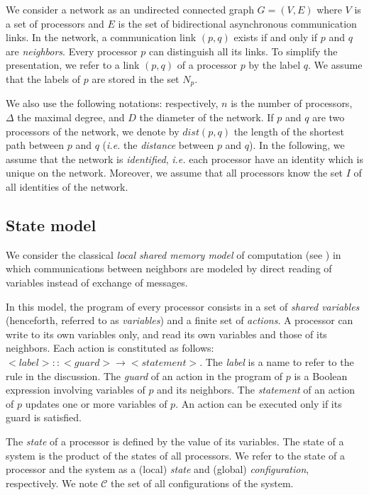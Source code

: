 \documentclass[11pt]{article}
\begin{document}
We consider a network as an undirected connected graph $G=(V,E)$ where $V$ is a set of processors and $E$ is the set of bidirectional asynchronous communication links. In the network, a communication link $(p,q)$ exists if and only if $p$ and $q$ are \emph{neighbors}. Every processor $p$ can distinguish all its links. To simplify the presentation, we refer to a link $(p,q)$ of a processor $p$ by the label $q$. We assume that the labels of $p$ are stored in the set $N_{p}$. 

We also use the following notations: respectively, $n$ is the number of processors, $\Delta$ the maximal degree, and $D$ the diameter of the network. If $p$ and $q$ are two processors of the network, we denote by $dist(p,q)$ the length of the shortest path between $p$ and $q$ (\emph{i.e.} the \emph{distance} between $p$ and $q$). In the following, we assume that the network is \emph{identified}, \emph{i.e.} each processor have an identity which is unique on the network. Moreover, we assume that all processors know the set $I$ of all identities of the network.

\subsection{State model}\label{sub:State-model}

We consider the classical \emph{local shared memory model} of computation (see \cite{T01}) in which communications between neighbors are modeled by direct reading of variables instead of exchange of messages. 

In this model, the program of every processor consists in a set of \emph{shared variables} (henceforth, referred to as \emph{variables}) and a finite set of \emph{actions}. A processor can write to its own variables only, and read its own variables and those of its neighbors. Each action is constituted as follows: $< label >::< guard >\longrightarrow< statement >$. The \emph{label} is a name to refer to the rule in the discussion. The \emph{guard} of an action in the program of $p$ is a Boolean expression involving variables of $p$ and its neighbors. The \emph{statement} of an action of $p$ updates one or more variables of $p$. An action can be executed only if its guard is satisfied.

The \emph{state} of a processor is defined by the value of its variables. The state of a system is the product of the states of all processors. We refer to the state of a processor and the system as a (local) \emph{state} and (global) \emph{configuration}, respectively. We note $\mathcal{C}$ the set of all configurations of the system. 
\end{document}
